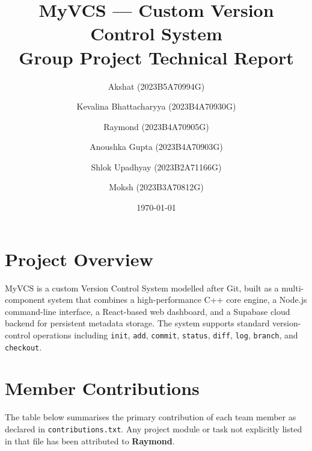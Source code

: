 \documentclass{article}
\title{\textbf{MyVCS --- Custom Version Control System}\\[0.5em]
       \large Group Project Technical Report}
\author{
    Akshat (2023B5A70994G) \and
    Kevalina Bhattacharyya (2023B4A70930G) \and
    Raymond (2023B4A70905G) \and
    Anoushka Gupta (2023B4A70903G) \and
    Shlok Upadhyay (2023B2A71166G) \and
    Moksh (2023B3A70812G)
}
\date{\today}
\begin{document}
\maketitle
\tableofcontents
\newpage

\section{Project Overview}

MyVCS is a custom Version Control System modelled after Git, built as a
multi-component system that combines a high-performance C++ core engine, a
Node.js command-line interface, a React-based web dashboard, and a Supabase
cloud backend for persistent metadata storage.  The system supports standard
version-control operations including \texttt{init}, \texttt{add},
\texttt{commit}, \texttt{status}, \texttt{diff}, \texttt{log},
\texttt{branch}, and \texttt{checkout}.

\section{Member Contributions}

The table below summarises the primary contribution of each team member as
declared in \texttt{contributions.txt}.  Any project module or task not
explicitly listed in that file has been attributed to \textbf{Raymond}.
\end{document}
